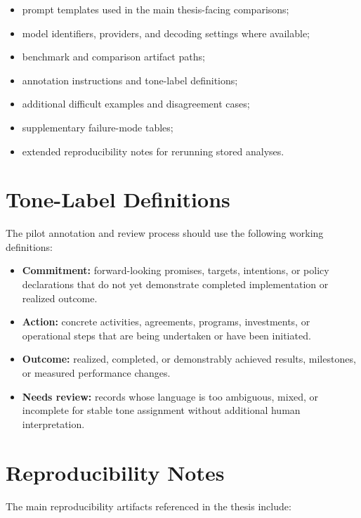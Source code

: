 \documentclass[english, online, cse, master]{dithesis}
\providecommand{\tightlist}{\setlength{\itemsep}{0pt}\setlength{\parskip}{0pt}}
\begin{document}
\begin{itemize}
\def\labelenumi{\arabic{enumi}.}
\tightlist
\item
  prompt templates used in the main thesis-facing comparisons;
\item
  model identifiers, providers, and decoding settings where available;
\item
  benchmark and comparison artifact paths;
\item
  annotation instructions and tone-label definitions;
\item
  additional difficult examples and disagreement cases;
\item
  supplementary failure-mode tables;
\item
  extended reproducibility notes for rerunning stored analyses.
\end{itemize}

\section{Tone-Label Definitions}\label{tone-label-definitions}

The pilot annotation and review process should use the following working definitions:

\begin{itemize}
\def\labelenumi{\arabic{enumi}.}
\tightlist
\item
  \textbf{Commitment:} forward-looking promises, targets, intentions, or policy declarations that do not yet demonstrate completed implementation or realized outcome.
\item
  \textbf{Action:} concrete activities, agreements, programs, investments, or operational steps that are being undertaken or have been initiated.
\item
  \textbf{Outcome:} realized, completed, or demonstrably achieved results, milestones, or measured performance changes.
\item
  \textbf{Needs review:} records whose language is too ambiguous, mixed, or incomplete for stable tone assignment without additional human interpretation.
\end{itemize}

\section{Reproducibility Notes}\label{reproducibility-notes}

The main reproducibility artifacts referenced in the thesis include:
\end{document}
